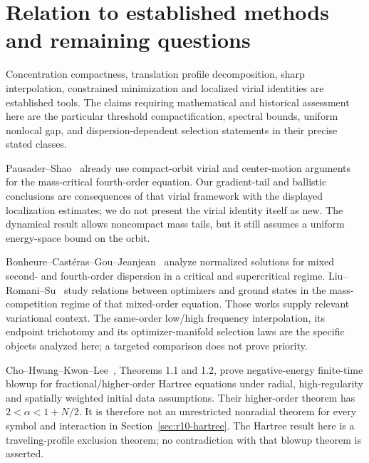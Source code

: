 \documentclass[11pt,a4paper]{article}
\theoremstyle{remark}\newtheorem{remark}[theorem]{Remark}
\begin{document}







\section{Relation to established methods and remaining questions}
Concentration compactness, translation profile decomposition, sharp
interpolation, constrained minimization and localized virial identities
are established tools. The claims requiring mathematical and historical
assessment here are the particular threshold compactification,
spectral bounds, uniform nonlocal gap, and dispersion-dependent
selection statements in their precise stated classes.

Pausader--Shao~\cite{PS} already use compact-orbit virial and center-motion
arguments for the mass-critical fourth-order equation. Our gradient-tail
and ballistic conclusions are consequences of that virial framework
with the displayed localization estimates; we do not present the virial
identity itself as new. The dynamical result allows noncompact mass
tails, but it still assumes a uniform energy-space bound on the orbit.

Bonheure--Cast\'eras--Gou--Jeanjean~\cite{BCGJ} analyze normalized
solutions for mixed second- and fourth-order dispersion in a critical
and supercritical regime. Liu--Romani--Su~\cite{LRS} study relations
between optimizers and ground states in the mass-competition regime
of that mixed-order equation. Those works supply relevant variational
context. The same-order low/high frequency interpolation, its endpoint
trichotomy and its optimizer-manifold selection laws are the specific
objects analyzed here; a targeted comparison does not prove priority.

Cho--Hwang--Kwon--Lee~\cite{CHKL}, Theorems 1.1 and 1.2, prove
negative-energy finite-time blowup for fractional/higher-order Hartree
equations under radial, high-regularity and spatially weighted initial
data assumptions. Their higher-order theorem has
$2<\alpha<1+N/2$. It is therefore not an unrestricted nonradial theorem
for every symbol and interaction in Section~\ref{sec:r10-hartree}.
The Hartree result here is a traveling-profile exclusion theorem; no
contradiction with that blowup theorem is asserted.
\end{document}
